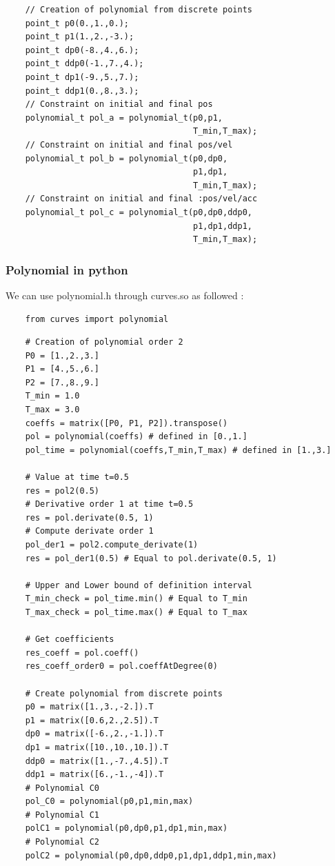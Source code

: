 \documentclass{article}
\begin{document}
\begin{lstlisting}
    // Creation of polynomial from discrete points
    point_t p0(0.,1.,0.);
    point_t p1(1.,2.,-3.);
    point_t dp0(-8.,4.,6.);
    point_t ddp0(-1.,7.,4.);
    point_t dp1(-9.,5.,7.);
    point_t ddp1(0.,8.,3.);
    // Constraint on initial and final pos
    polynomial_t pol_a = polynomial_t(p0,p1,
                                      T_min,T_max);
    // Constraint on initial and final pos/vel
    polynomial_t pol_b = polynomial_t(p0,dp0,
                                      p1,dp1,
                                      T_min,T_max);
    // Constraint on initial and final :pos/vel/acc
    polynomial_t pol_c = polynomial_t(p0,dp0,ddp0,
                                      p1,dp1,ddp1,
                                      T_min,T_max);
    \end{lstlisting}
        
    \subsubsection{Polynomial in python}
        We can use polynomial.h through curves.so as followed :
    \begin{lstlisting}
    from curves import polynomial
    \end{lstlisting}
    \begin{lstlisting}
    # Creation of polynomial order 2
    P0 = [1.,2.,3.]
    P1 = [4.,5.,6.]
    P2 = [7.,8.,9.]
    T_min = 1.0
    T_max = 3.0
    coeffs = matrix([P0, P1, P2]).transpose()
    pol = polynomial(coeffs) # defined in [0.,1.]
    pol_time = polynomial(coeffs,T_min,T_max) # defined in [1.,3.]
    
    # Value at time t=0.5
    res = pol2(0.5)
    # Derivative order 1 at time t=0.5
    res = pol.derivate(0.5, 1)
    # Compute derivate order 1
    pol_der1 = pol2.compute_derivate(1)
    res = pol_der1(0.5) # Equal to pol.derivate(0.5, 1)
    
    # Upper and Lower bound of definition interval
    T_min_check = pol_time.min() # Equal to T_min
    T_max_check = pol_time.max() # Equal to T_max
    
    # Get coefficients
    res_coeff = pol.coeff()
    res_coeff_order0 = pol.coeffAtDegree(0)
    
    # Create polynomial from discrete points
    p0 = matrix([1.,3.,-2.]).T
    p1 = matrix([0.6,2.,2.5]).T
    dp0 = matrix([-6.,2.,-1.]).T
    dp1 = matrix([10.,10.,10.]).T
    ddp0 = matrix([1.,-7.,4.5]).T
    ddp1 = matrix([6.,-1.,-4]).T
    # Polynomial C0
    pol_C0 = polynomial(p0,p1,min,max)
    # Polynomial C1
    polC1 = polynomial(p0,dp0,p1,dp1,min,max)
    # Polynomial C2
    polC2 = polynomial(p0,dp0,ddp0,p1,dp1,ddp1,min,max)
    \end{lstlisting}
\end{document}
